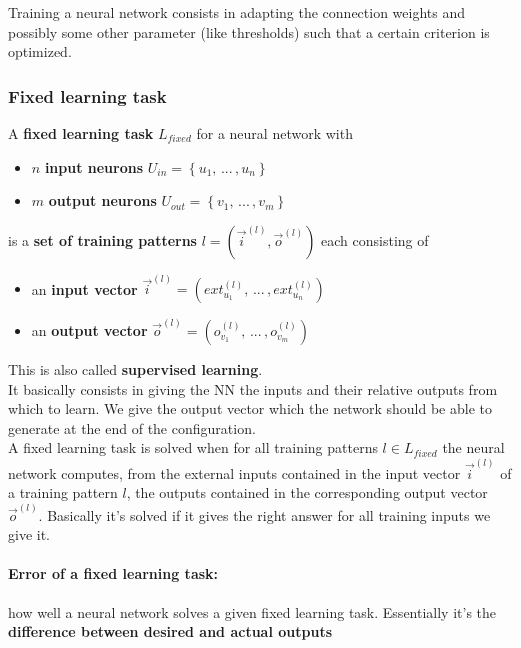 \documentclass[11pt]{article}
\begin{document}
		Training a neural network consists in adapting the connection weights and possibly some other parameter (like thresholds) such that a certain criterion is optimized.\\
		
		\newpage
		
		\subsubsection{Fixed learning task}
		A \textbf{fixed learning task} $L_{fixed}$ for a neural network with
		\begin{itemize}
			\item $n$ \textbf{input neurons} $U_{in} = \left\{u_1, \, ... \, , u_n \right\}$
			\item $m$ \textbf{output neurons} $U_{out} = \left\{v_1, \, ... \, , v_m \right\}$
		\end{itemize}
		is a \textbf{set of training patterns} $l = \left(\vec{i}^{(l)}, \vec{o}^{(l)}\right)$ each consisting of 
		\begin{itemize}
			\item an \textbf{input vector }$\vec{i}^{(l)} = \left(ext_{u_1}^{(l)}, \, ... \, , ext_{u_n}^{(l)}\right)$
			\item an \textbf{output vector} $\vec{o}^{(l)} = \left(o_{v_1}^{(l)}, \, ... \, , o_{v_m}^{(l)}\right)$
		\end{itemize}
		
		This is also called \textbf{supervised learning}.\\
		It basically consists in giving the NN the inputs and their relative outputs from which to learn. We give the output vector which the network should be able to generate at the end of the configuration.\\
		
		A fixed learning task is solved when for all training patterns $l \in L_{fixed}$ the neural network computes, from the external inputs contained in the input vector $\vec{i}^{(l)}$ of a training pattern $l$, the outputs contained in the corresponding output vector $\vec{o}^{(l)}$. Basically it's solved if it gives the right answer for all training inputs we give it.
		
		\paragraph{Error of a fixed learning task:} how well a neural network solves a given fixed learning task. Essentially it's the \textbf{difference between desired and actual outputs}
		
\end{document}
